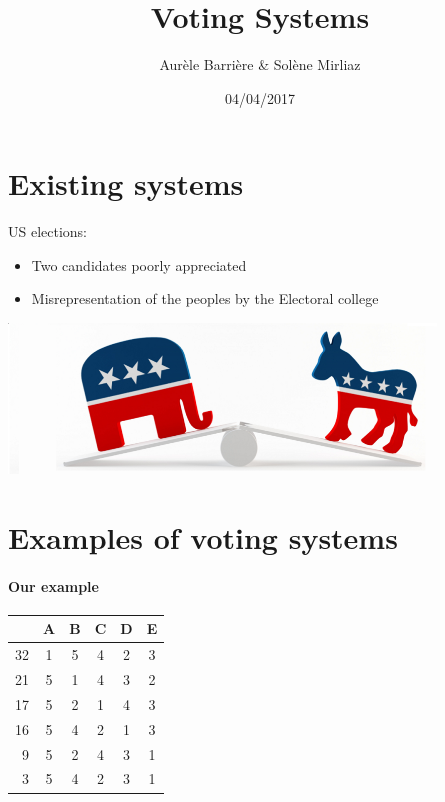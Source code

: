 \documentclass[utf8]{earlywinter}
\title{Voting Systems}
\author{Aur\`ele Barri\`ere \& Sol\`ene Mirliaz}
\date{04/04/2017}
\begin{document}
\begin{frame}
\maketitle
\end{frame}

\section{Existing systems}
\begin{frame}{\secname}
  US elections:
  \begin{itemize}
    \item Two candidates poorly appreciated
    \item Misrepresentation of the peoples by the Electoral college
  \end{itemize}
  \begin{center}
    \includegraphics[width=\linewidth]{us.png}
  \end{center}
  
\end{frame}

\section{Examples of voting systems}
\begin{frame}{\secname}
  \framesubtitle{Our example}
  \centering
  \begin{tabular}{r | c c c c c |}
       & A & B & C & D & E \\ \hline
    32 & 1 & 5 & 4 & 2 & 3 \\
    21 & 5 & 1 & 4 & 3 & 2 \\
    17 & 5 & 2 & 1 & 4 & 3 \\
    16 & 5 & 4 & 2 & 1 & 3 \\
    9  & 5 & 2 & 4 & 3 & 1 \\
    3  & 5 & 4 & 2 & 3 & 1 \\ \hline
  \end{tabular}
  \vfill
\end{frame}
\end{document}
